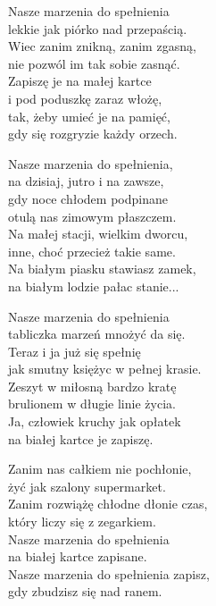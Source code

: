 \begin{text}
    Nasze marzenia do spełnienia\\
    lekkie jak piórko nad przepaścią.\\
    Wiec zanim znikną, zanim zgasną,\\
    nie pozwól im tak sobie zasnąć.\\
    Zapiszę je na małej kartce\\
    i pod poduszkę zaraz włożę,\\
    tak, żeby umieć je na pamięć,\\
    gdy się rozgryzie każdy orzech.

    Nasze marzenia do spełnienia,\\
    na dzisiaj, jutro i na zawsze,\\
    gdy noce chłodem podpinane\\
    otulą nas zimowym płaszczem.\\
    Na małej stacji, wielkim dworcu,\\
    inne, choć przecież takie same.\\
    Na białym piasku stawiasz zamek,\\
    na białym lodzie pałac stanie...

    Nasze marzenia do spełnienia\\
    tabliczka marzeń mnożyć da się.\\
    Teraz i ja już się spełnię\\
    jak smutny księżyc w pełnej krasie.\\
    Zeszyt w miłosną bardzo kratę\\
    brulionem w długie linie życia.\\
    Ja, człowiek kruchy jak opłatek\\
    na białej kartce je zapiszę.

    Zanim nas całkiem nie pochłonie,\\
    żyć jak szalony supermarket.\\
    Zanim rozwiążę chłodne dłonie czas,\\
    który liczy się z zegarkiem.\\
    Nasze marzenia do spełnienia\\
    na białej kartce zapisane.\\
    Nasze marzenia do spełnienia zapisz,\\
    gdy zbudzisz się nad ranem.
\end{text}
\begin{chord}

\end{chord}